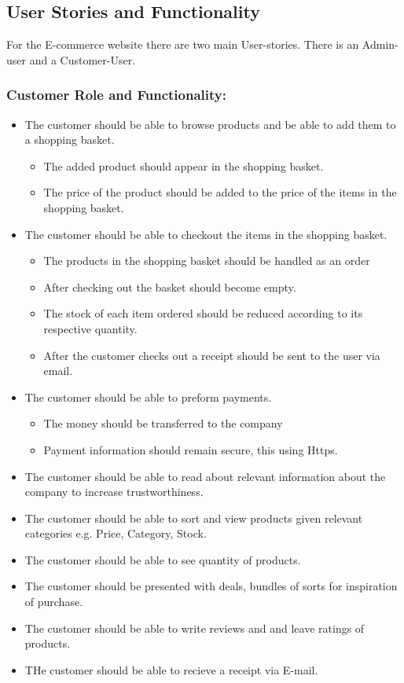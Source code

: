 \subsection{User Stories and Functionality}

For the E-commerce website there are two main User-stories. There is an
Admin-user and a Customer-User.

\subsubsection{Customer Role and Functionality:}

\begin{itemize}
    \item The customer should be able to browse products and be able to add
    them to a shopping basket.
    \begin{itemize}
        \item The added product should appear in the shopping basket.
        \item The price of the product should be added to the price of the
        items in the shopping basket.
    \end{itemize}
\item The customer should be able to checkout the items in the shopping basket.
    \begin{itemize}
        \item The products in the shopping basket should be handled as an order
        \item After checking out the basket should become empty.
        \item The stock of each item ordered should be reduced according to
        its respective quantity.
        \item After the customer checks out a receipt should be sent to the
        user via email.
    \end{itemize}
\item The customer should be able to preform payments.
    \begin{itemize}
        \item The money should be transferred to the company
        \item Payment information should remain secure, this using Https.
    \end{itemize}
    \item The customer should be able to read about relevant information
    about the company to increase trustworthiness.
    \item The customer should be able to sort and view  products given
    relevant categories e.g. Price, Category, Stock.
    \item The customer should be able to see quantity of products. 
    \item The customer should be presented with deals, bundles of sorts for
    inspiration of purchase.
    \item The customer should be able to write reviews and and leave ratings
    of products.
    \item THe customer should be able to recieve a receipt via E-mail. 
\end{itemize}

